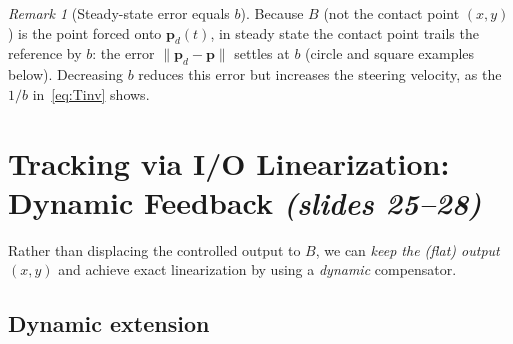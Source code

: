 \documentclass[11pt,a4paper]{article}
\newcommand{\vect}[1]{\bm{#1}}
\newcommand{\pd}{\vect{p}_d}
\theoremstyle{plain}
\theoremstyle{definition}
\theoremstyle{remark}
\newtheorem*{remark}{Remark}
\begin{document}
\begin{remark}[Steady-state error equals $b$]
Because $B$ (not the contact point $(x,y)$) is the point forced onto $\pd(t)$, in steady state the contact point trails the reference by $b$: the error $\|\pd-\vect p\|$ settles at $b$ (circle and square examples below). Decreasing $b$ reduces this error but increases the steering velocity, as the $1/b$ in~\eqref{eq:Tinv} shows.
\end{remark}

\section{Tracking via I/O Linearization: Dynamic Feedback \texorpdfstring{\emph{(slides 25--28)}}{(slides 25--28)}}

Rather than displacing the controlled output to $B$, we can \emph{keep the (flat) output $(x,y)$} and achieve exact linearization by using a \emph{dynamic} compensator.

\subsection{Dynamic extension}
\end{document}
